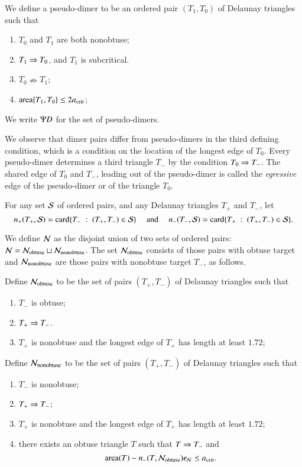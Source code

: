\begin{definition}
  We define a pseudo-dimer to be an ordered pair $(T_1,T_0)$ of
  Delaunay triangles such that
\begin{enumerate}
\item $T_0$ and $T_1$ are both nonobtuse;
\item $T_1\Ra T_0$, and  $T_1$ is subcritical.
\item $T_0 \nRightarrow T_1$;
\item $\area\{T_1,T_0\} \le 2\acrit$;
\end{enumerate}
We write $\PD$ for the set of pseudo-dimers.
\end{definition}

We observe that dimer pairs differ from pseudo-dimers in the third
defining condition, which is a condition on the location of the
longest edge of $T_0$.  Every pseudo-dimer determines a third triangle
$T_-$ by the condition $T_0\Ra T_-$.  The shared edge of $T_0$ and
$T_-$, leading out of the pseudo-dimer is called the {\it egressive} edge of
the pseudo-dimer or of the triangle $T_0$.

For any set $\S$ of ordered pairs, and any Delaunay triangles $T_+$ and $T_-$,
let 
\[
n_+(T_+,\S) = \card \{T_-\mid (T_+,T_-)\in \S\}
\quad\text{ and }\quad
n_-(T_-,\S)
= \card \{T_+\mid (T_+,T_-)\in \S\}.
\]

We define $\N$ as the disjoint union of two sets of ordered pairs: $\N
= \N_{\text{obtuse}} \sqcup \N_{\text{nonobtuse}}$.  The set
$\N_{\text{obtuse}}$ consists of those pairs with obtuse target and
$\N_{\text{nonobtuse}}$ are those pairs with nonobtuse target $T_-$,
as follows.

Define $\N_{\text{obtuse}}$ to be the set of pairs $(T_+,T_-)$ of
Delaunay triangles such that
\begin{enumerate}
\item $T_-$ is obtuse;
\item $T_+\Ra T_-$.
\item $T_+$ is nonobtuse and the longest edge of $T_+$ has length at
  least $1.72$;
\end{enumerate}

Define  $\N_{\text{nonobtuse}}$ to 
be the set of pairs $(T_+,T_-)$ of Delaunay triangles such that
\begin{enumerate}
\item $T_-$ is nonobtuse;
\item $T_+\Ra T_-$;
\item $T_+$ is nonobtuse and the longest edge of $T_+$ has length at
  least $1.72$;
\item there exists an obtuse triangle $T$ such that $T\Ra T_-$ and 
\[
\area(T) -   n_-(T,\N_{\text{obtuse}})\epsN\le \acrit.
\]
\end{enumerate}

